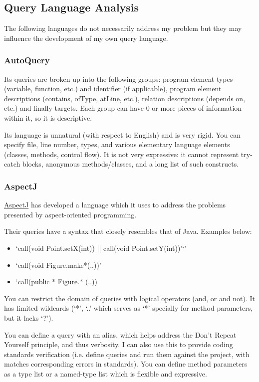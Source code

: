 \documentclass[12pt, letterpaper, oneside]{article}
\begin{document}
\subsection{Query Language Analysis}
The following languages do not necessarily address my problem but they may influence the development of my own query language.

\subsubsection{AutoQuery}
Its queries are broken up into the following groups: program element types (variable, function, etc.) and identifier (if applicable), program element descriptions (contains, ofType, atLine, etc.), relation descriptions (depends on, etc.) and finally targets.
Each group can have 0 or more pieces of information within it, so it is descriptive.

Its language is unnatural (with respect to English) and is very rigid.
You can specify file, line number, types, and various elementary language elements (classes, methods, control flow).
It is not very expressive: it cannot represent try-catch blocks, anonymous methods/classes, and a long list of such constructs.

\subsubsection{AspectJ}
\href{https://eclipse.org/aspectj/doc/next/progguide/starting-aspectj.html}{AspectJ} has developed a language which it uses to address the problems presented by aspect-oriented programming.  

Their queries have a syntax that closely resembles that of Java. Examples below:
\begin{itemize}
    \item `call(void Point.setX(int)) || call(void Point.setY(int))'`'
    \item `call(void Figure.make*(..))'
    \item `call(public * Figure.* (..))
\end{itemize}

You can restrict the domain of queries with logical operators (and, or and not).
It has limited wildcards (`*', `..' which serves as `*' specially for method parameters, but it lacks `?').

You can define a query with an alias, which helps address the Don't Repeat Yourself principle, and thus verbosity.
I can also use this to provide coding standards verification (i.e. define queries and run them against the project, with matches corresponding errors in standards).
You can define method parameters as a type list or a named-type list which is flexible and expressive.
\end{document}
